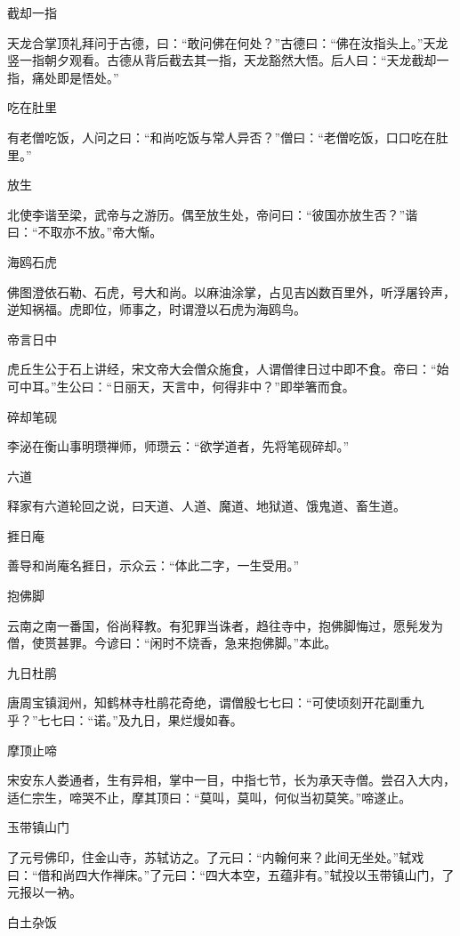 \documentclass[a4paper,12pt,UTF8,twoside]{ctexbook}
\begin{document}
    截却一指
    
    天龙合掌顶礼拜问于古德，曰：“敢问佛在何处？”古德曰：“佛在汝指头上。”天龙竖一指朝夕观看。古德从背后截去其一指，天龙豁然大悟。后人曰：“天龙截却一指，痛处即是悟处。”
    
    吃在肚里
    
    有老僧吃饭，人问之曰：“和尚吃饭与常人异否？”僧曰：“老僧吃饭，口口吃在肚里。”
    
    放生
    
    北使李谐至梁，武帝与之游历。偶至放生处，帝问曰：“彼国亦放生否？”谐曰：“不取亦不放。”帝大惭。
    
    海鸥石虎
    
    佛图澄依石勒、石虎，号大和尚。以麻油涂掌，占见吉凶数百里外，听浮屠铃声，逆知祸福。虎即位，师事之，时谓澄以石虎为海鸥鸟。
    
    帝言日中
    
    虎丘生公于石上讲经，宋文帝大会僧众施食，人谓僧律日过中即不食。帝曰：“始可中耳。”生公曰：“日丽天，天言中，何得非中？”即举箸而食。
    
    碎却笔砚
    
    李泌在衡山事明瓒禅师，师瓒云：“欲学道者，先将笔砚碎却。”
    
    六道
    
    释家有六道轮回之说，曰天道、人道、魔道、地狱道、饿鬼道、畜生道。
    
    捱日庵
    
    善导和尚庵名捱日，示众云：“体此二字，一生受用。”
    
    抱佛脚
    
    云南之南一番国，俗尚释教。有犯罪当诛者，趋往寺中，抱佛脚悔过，愿髡发为僧，使贳甚罪。今谚曰：“闲时不烧香，急来抱佛脚。”本此。
    
    九日杜鹃
    
    唐周宝镇润州，知鹤林寺杜鹃花奇绝，谓僧殷七七曰：“可使顷刻开花副重九乎？”七七曰：“诺。”及九日，果烂熳如春。
    
    摩顶止啼
    
    宋安东人娄通者，生有异相，掌中一目，中指七节，长为承天寺僧。尝召入大内，适仁宗生，啼哭不止，摩其顶曰：“莫叫，莫叫，何似当初莫笑。”啼遂止。
    
    玉带镇山门
    
    了元号佛印，住金山寺，苏轼访之。了元曰：“内翰何来？此间无坐处。”轼戏曰：“借和尚四大作禅床。”了元曰：“四大本空，五蕴非有。”轼投以玉带镇山门，了元报以一衲。
    
    白土杂饭
    
\end{document}
